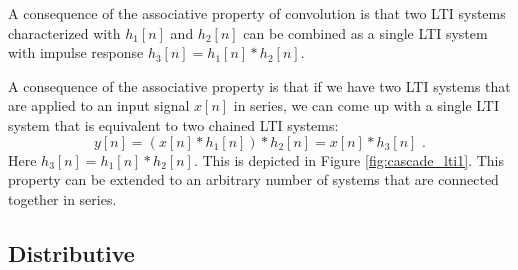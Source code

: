 \begin{marginfigure}
  \begin{center}
  \end{center}
  \caption{A consequence of the associative property of convolution is
  that two LTI systems characterized with $h_1[n]$ and $h_2[n]$ can be
  combined as a single LTI system with impulse response
  $h_3[n]=h_1[n]*h_2[n]$.}
  \label{fig:cascade_lti1}
\end{marginfigure}

A consequence of the associative property is that if we have two LTI
systems that are applied to an input signal $x[n]$ in series, we can
come up with a single LTI system that is equivalent to two  chained LTI systems:
\begin{equation}
  y[n] = (x[n]*h_1[n])*h_2[n] = x[n]*h_3[n]\,\,.
\end{equation}
Here $h_3[n]=h_1[n]*h_2[n]$. This is depicted in Figure
\ref{fig:cascade_lti1}. This property can be extended to an arbitrary
number of systems that are connected together in series.

\subsection{Distributive}

